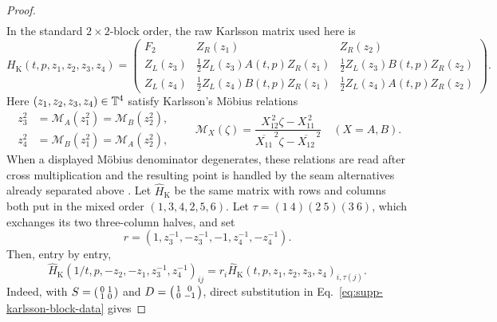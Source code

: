 \begin{proof}
\begin{equation}
\begin{gathered}
\end{gathered}
\label{eq:supp-karlsson-block-data}
\end{equation}
In the standard $2\times2$-block order, the raw Karlsson matrix used here is
\begin{equation}
 H_{\mathrm K}(t,p,z_1,z_2,z_3,z_4)=
 \begin{pmatrix}
 F_2&Z_R(z_1)&Z_R(z_2)\\
 Z_L(z_3)&\frac12Z_L(z_3)A(t,p)Z_R(z_1)
             &\frac12Z_L(z_3)B(t,p)Z_R(z_2)\\
 Z_L(z_4)&\frac12Z_L(z_4)B(t,p)Z_R(z_1)
             &\frac12Z_L(z_4)A(t,p)Z_R(z_2)
 \end{pmatrix}.
\label{eq:supp-karlsson-raw-matrix}
\end{equation}
Here $(z_1,z_2,z_3,z_4)\in\mathbb T^4$ satisfy Karlsson's M\"obius relations
\begin{equation}
\begin{aligned}
z_3^2&=\mathcal M_A(z_1^2)=\mathcal M_B(z_2^2),\\
z_4^2&=\mathcal M_B(z_1^2)=\mathcal M_A(z_2^2),
\end{aligned}
\qquad
\mathcal M_X(\zeta)=
\frac{X_{12}^{\,2}\zeta-X_{11}^{\,2}}
{\overline{X_{11}}^{\,2}\zeta-\overline{X_{12}}^{\,2}}
\quad(X=A,B).
\label{eq:supp-karlsson-mobius-domain}
\end{equation}
When a displayed M\"obius denominator degenerates, these relations are read after cross multiplication and the resulting point is handled by the seam alternatives already separated above \cite{Karlsson2011H2,Karlsson2011ThreeParameter}. Let $\widehat H_{\mathrm K}$ be the same matrix with rows and columns both put in the mixed order $(1,3,4,2,5,6)$.  Let $\tau=(1\ 4)(2\ 5)(3\ 6)$, which exchanges its two three-column halves, and set
\begin{equation}
 r=(1,z_3^{-1},-z_3^{-1},-1,z_4^{-1},-z_4^{-1}).
\label{eq:supp-karlsson-reciprocal-phases}
\end{equation}
Then, entry by entry,
\begin{equation}
 \widehat H_{\mathrm K}(1/t,p,-z_2,-z_1,z_3^{-1},z_4^{-1})_{ij}
 =r_i\widehat H_{\mathrm K}(t,p,z_1,z_2,z_3,z_4)_{i,\tau(j)}.
\label{eq:supp-karlsson-reciprocal-entrywise}
\end{equation}
Indeed, with $S=\begin{psmallmatrix}0&1\\1&0\end{psmallmatrix}$ and $D=\begin{psmallmatrix}1&0\\0&-1\end{psmallmatrix}$, direct substitution in Eq.~\eqref{eq:supp-karlsson-block-data} gives

\end{proof}
